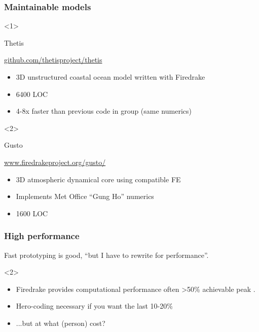 \documentclass[presentation]{beamer}
\begin{document}
\begin{frame}
  \frametitle{Maintainable models}
  \begin{overlayarea}{\textwidth}{0.8\textheight}
    \begin{onlyenv}<1>
      \begin{block}{Thetis}
        \begin{center}
          \url{github.com/thetisproject/thetis}
        \end{center}
        \begin{itemize}
        \item 3D unstructured coastal ocean model written with
          Firedrake
        \item 6400 LOC
        \item 4-8x faster than previous code in group (same numerics)
        \end{itemize}
      \end{block}
    \end{onlyenv}
    \begin{onlyenv}<2>
      \begin{block}{Gusto}
        \begin{center}
          \url{www.firedrakeproject.org/gusto/}
        \end{center}
        \begin{itemize}
        \item 3D atmospheric dynamical core using compatible FE
        \item Implements Met Office ``Gung Ho'' numerics
        \item 1600 LOC
        \end{itemize}
      \end{block}
    \end{onlyenv}
  \end{overlayarea}
\end{frame}

\begin{frame}
  \frametitle{High performance}
  Fast prototyping is good, ``but I have to rewrite for performance''.

  \begin{uncoverenv}<2>
    \begin{itemize}
    \item Firedrake provides computational performance often >50\%
      achievable peak \parencite{Luporini:2015,Bercea:2016,Mitchell:2016}.
    \item Hero-coding necessary if you want the last 10-20\%
    \item ...but at what (person) cost?
    \end{itemize}
  \end{uncoverenv}
\end{frame}
\end{document}
